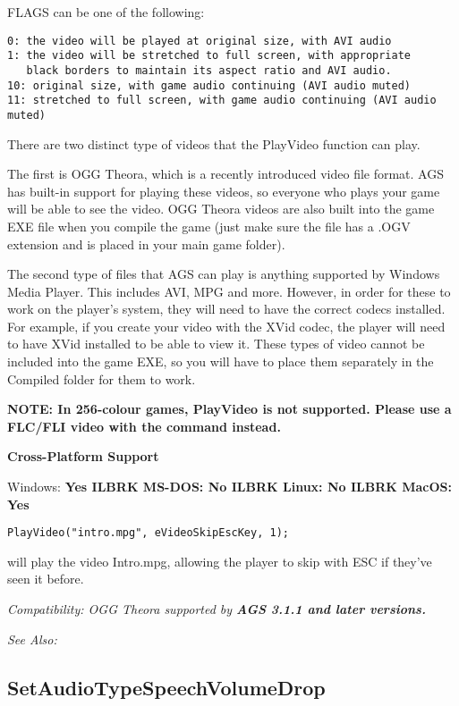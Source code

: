 FLAGS can be one of the following:
\begin{verbatim}
0: the video will be played at original size, with AVI audio
1: the video will be stretched to full screen, with appropriate
   black borders to maintain its aspect ratio and AVI audio.
10: original size, with game audio continuing (AVI audio muted)
11: stretched to full screen, with game audio continuing (AVI audio muted)
\end{verbatim}

There are two distinct type of videos that the PlayVideo function can play.

The first is OGG Theora, which is a recently introduced video file format. AGS
has built-in support for playing these videos, so everyone who plays your game
will be able to see the video. OGG Theora videos are also built into the game EXE
file when you compile the game (just make sure the file has a .OGV extension and
is placed in your main game folder).

The second type of files that AGS can play is anything supported by Windows Media
Player. This includes AVI, MPG and more. However, in order for these to work on
the player's system, they will need to have the correct codecs installed. For example,
if you create your video with the XVid codec, the player will need to have XVid installed
to be able to view it. These types of video cannot be included into the game EXE,
so you will have to place them separately in the Compiled folder for them to work.

\bf{NOTE:} In 256-colour games, PlayVideo is not supported. Please use a FLC/FLI video
with the  command instead.

\bf{Cross-Platform Support}

Windows: \bf{ Yes }ILBRK
MS-DOS: \bf{ No }ILBRK
Linux: \bf{ No }ILBRK
MacOS: \bf{ Yes }

\begin{verbatim}
PlayVideo("intro.mpg", eVideoSkipEscKey, 1);
\end{verbatim}
will play the video Intro.mpg, allowing the player to skip with ESC if they've seen it
before.

\it{Compatibility:} OGG Theora supported by \bf{AGS 3.1.1} and later versions.

\it{See Also:} 


\subsection{SetAudioTypeSpeechVolumeDrop}\label{Game.SetAudioTypeSpeechVolumeDrop}%

